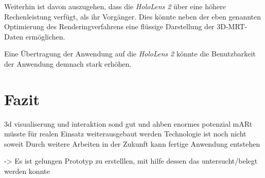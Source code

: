 Weiterhin ist davon auszugehen, dass die \textit{HoloLens 2} über eine höhere Rechenleistung verfügt, als ihr Vorgänger. Dies könnte neben der eben genannten Optimierung des Renderingverfahrens eine flüssige Darstellung der 3D-MRT-Daten ermöglichen.

Eine Übertragung der Anwendung auf die \textit{HoloLens 2} könnte die Benutzbarkeit der Anwendung demnach stark erhöhen.


\section{Fazit}

3d visualiserung und interaktion sond gut und ahben enormes potenzial
mARt müsste für realen Einsatz weiterausgebaut werden
Technologie ist noch nicht soweit
Durch weitere Arbeiten in der Zukunft kann fertige Anwendung entstehen

-> Es ist gelungen Prototyp zu erstelllen, mit hilfe dessen das untersucht/belegt werden konnte